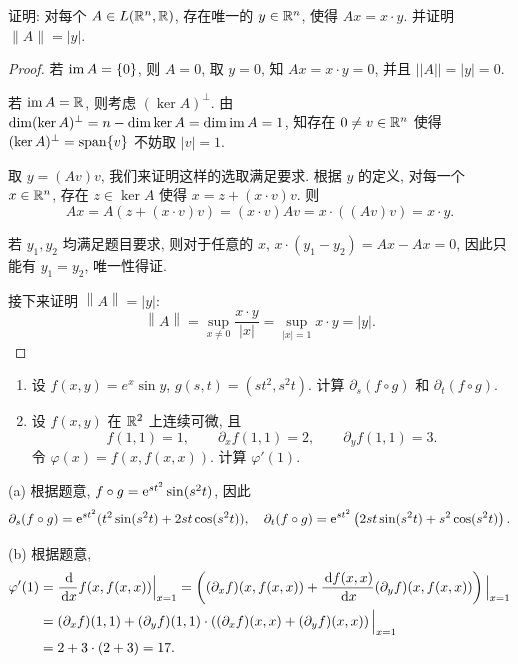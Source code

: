 \documentclass{article}
\begin{document}
\begin{problem}
  证明: 对每个 $A\in L(\mathbb{R}^n,\mathbb{R})$, 存在唯一的 $y\in\mathbb{R}^n$, 使得 $Ax=x\cdot y$. 并证明 $\|A\|=|y|$.
\end{problem}

\begin{proof}
	若 $\operatorname{im} A = \{0\}$, 则 $A=0$, 取 $y=0$, 知 $Ax = x \cdot y = 0$, 并且 $||A|| = |y| = 0$.

	若 $\operatorname{im} A = \mathbb{R}$, 则考虑 $(\ker A)^\perp$. 由 $\dim (\ker A)^\perp = n-\dim\ker A = \dim\operatorname{im} A = 1$, 知存在 $0 \neq v \in \mathbb{R}^n$ 使得 $(\ker A)^\perp = \operatorname{span}\{v\}$ 不妨取 $|v| = 1$. 

	取 $y = (Av)v$, 我们来证明这样的选取满足要求. 根据 $y$ 的定义, 对每一个 $x\in \mathbb{R}^n$, 存在 $z\in\ker A$ 使得 $x = z+(x\cdot v)v$. 则
	\[ Ax = A(z+(x\cdot v)v) = (x\cdot v)Av = x \cdot ((Av)v) = x \cdot y. \]

	若 $y_1,y_2$ 均满足题目要求, 则对于任意的 $x$, $x\cdot(y_1-y_2) = Ax-Ax=0$, 因此只能有 $y_1=y_2$, 唯一性得证.

	接下来证明 $\left\|A\right\| = |y|$: 
	\[ \left\|A\right\| = \sup\limits_{x \neq 0} \frac{x \cdot y}{|x|} = \sup\limits_{|x| = 1} x \cdot y = |y|. \]
\end{proof}



\begin{problem}
  \begin{enumerate}
    \item[(a)] 设 $f(x,y)=e^x\sin y$, $g(s,t)=(st^2,s^2t)$. 计算 $\partial_s(f\circ g)$ 和 $\partial_t(f\circ g)$.
    \item[(b)] 设 $f(x,y)$ 在 $\mathbb{R}^2$ 上连续可微, 且
    \[
      f(1,1)=1,\qquad \partial_x f(1,1)=2,\qquad \partial_y f(1,1)=3.
    \]
    令 $\varphi(x)=f(x,f(x,x))$. 计算 $\varphi'(1)$.
  \end{enumerate}
\end{problem}

\begin{solution}
	(a) 根据题意, $f \circ g = \mathrm{e}^{st^2} \sin (s^2t)$, 因此
	\[ \partial_s(f\circ g) = \mathrm{e}^{st^2} (t^2 \sin (s^2t) + 2st \cos (s^2t)), \quad 
	\partial_t(f\circ g) = \mathrm{e}^{st^2} \left( 2st \sin (s^2t) + s^2 \cos (s^2t) \right). \]

	(b) 根据题意, 
	\begin{align*}
		\varphi'(1) &= \frac{\,\mathrm{d}}{\,\mathrm{d} x}f(x,f(x,x))\Big|_{x=1}
		=\left( (\partial_xf)(x,f(x,x)) + \frac{\,\mathrm{d} f(x,x)}{\,\mathrm{d} x} (\partial_yf)(x,f(x,x)) \right)\Big|_{x=1} \\
		&= (\partial_xf)(1,1) + (\partial_yf)(1,1) \cdot \left( (\partial_xf)(x,x) + (\partial_yf)(x,x) \right) \Big|_{x=1} \\
		&= 2+3\cdot(2+3) = 17.
	\end{align*}
\end{solution}
\end{document}
